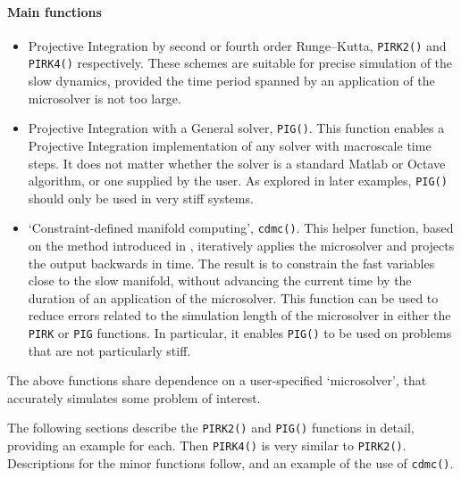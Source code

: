 \paragraph{Main functions}
\begin{itemize}
\item Projective Integration by second or fourth order Runge--Kutta, \verb|PIRK2()| and \verb|PIRK4()| respectively.
These schemes are suitable for precise simulation of the slow dynamics, provided the time period spanned by an application of the microsolver is not too large.
\item Projective Integration with a General solver, \verb|PIG()|.
This function enables a Projective Integration implementation of any solver with macroscale time steps.
It does not matter whether the solver is a standard Matlab or Octave algorithm, or one supplied by the user.
As explored in later examples, \verb|PIG()| should only be used in very stiff systems. 

\item `Constraint-defined manifold computing', \verb|cdmc()|.
This helper function, based on the method introduced in \cite{GearKevrekidis05},  iteratively applies the microsolver and projects the output backwards in time.
The result is to constrain the fast variables close to the slow manifold, without advancing the current time by the duration of an application of the microsolver.
This function can be used to reduce errors related to the simulation length of the microsolver in either the \verb|PIRK| or \verb|PIG| functions.
In particular, it enables \verb|PIG()| to be used on problems that are not particularly stiff.
\end{itemize}

The above functions share dependence on a user-specified `microsolver', that accurately simulates some problem of interest. 


The following sections describe the \verb|PIRK2()| and \verb|PIG()| functions in detail, providing an example for each.
Then \verb|PIRK4()| is very similar to \verb|PIRK2()|.
Descriptions for the minor functions follow, and an example of the use of \verb|cdmc()|.

